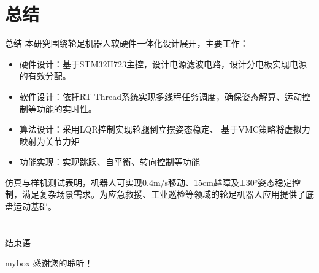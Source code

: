 \documentclass{beamer}
\begin{document}
	\section[总结]{总结}
	\begin{frame}{总结}
		本研究围绕轮足机器人软硬件一体化设计展开，主要工作：
		\begin{itemize}
			\item 硬件设计：基于STM32H723主控，设计电源滤波电路，设计分电板实现电源的有效分配。
			\item 软件设计：依托RT-Thread系统实现多线程任务调度，确保姿态解算、运动控制等功能的实时性。
			\item 算法设计：采用LQR控制实现轮腿倒立摆姿态稳定、
			基于VMC策略将虚拟力映射为关节力矩
		
			\item 功能实现：实现跳跃、自平衡、转向控制等功能
		\end{itemize}
		
	仿真与样机测试表明，机器人可实现0.4m/s移动、15cm越障及±30°姿态稳定控制，满足复杂场景需求。为应急救援、工业巡检等领域的轮足机器人应用提供了底盘运动基础。
	\end{frame}
	
	
	\section{}
	\begin{frame}{结束语}
		\begin{center}
			\begin{minipage}{1\textwidth}
				\begin{beamercolorbox}[wd=0.70\textwidth, rounded=true, shadow=true]{mybox}
					\LARGE \centering 感谢您的聆听！
				\end{beamercolorbox}
			\end{minipage}

		\end{center}
	\end{frame}
	
\end{document}
